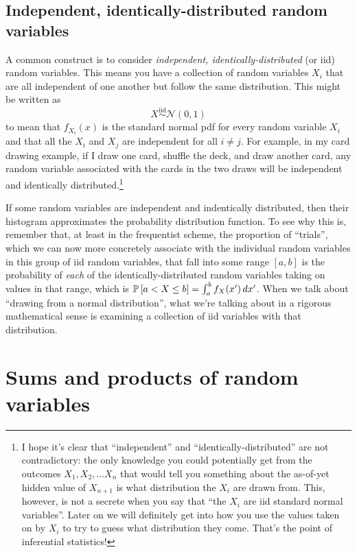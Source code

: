 \subsection{Independent, identically-distributed random variables}

A common construct is to consider \emph{independent, identically-distributed}
(or iid) random variables. This means you have a collection of random variables $X_i$
that are all independent of one another but follow the same distribution. This
might be written as
\begin{equation*}
X \stackrel{\text{iid}}{\sim} \mathcal{N}(0, 1)
\end{equation*}
to mean that $f_{X_i}(x)$ is the standard normal pdf for every random variable
$X_i$ and that all the $X_i$ and $X_j$ are independent for all $i \neq j$.
For example, in my card drawing example, if I draw one card, shuffle the deck,
and draw another card, any random variable associated with the cards in the
two draws will be independent and identically distributed.\footnote{I hope
it's clear that ``independent'' and ``identically-distributed'' are not
contradictory: the only knowledge you could potentially get from the outcomes
$X_1, X_2, \ldots X_n$ that would tell you something about the as-of-yet
hidden value of $X_{n+1}$ is what distribution the $X_i$ are drawn from. This,
however, is not a secrete when you say that ``the $X_i$ are iid standard
normal variables''. Later on we will definitely get into how you use the
values taken on by $X_i$ to try to guess what distribution they come. That's
the point of inferential statistics!}

If some random variables are independent and indentically distributed, then
their histogram approximates the probability distribution function. To see why
this is, remember that, at least in the frequentist scheme, the proportion of
``trials'', which we can now more concretely associate with the individual
random variables in this group of iid random variables, that fall into some
range $[a, b]$ is the probability of \emph{each} of the identically-distributed
random variables taking on values in that range, which is $\mathbb{P}\left[{a
< X \leq b}\right] = \int_a^b f_X(x') \,dx'$. When we talk about ``drawing from a
normal distribution'', what we're talking about in a rigorous mathematical
sense is examining a collection of iid variables with that distribution.

\section{Sums and products of random variables}

